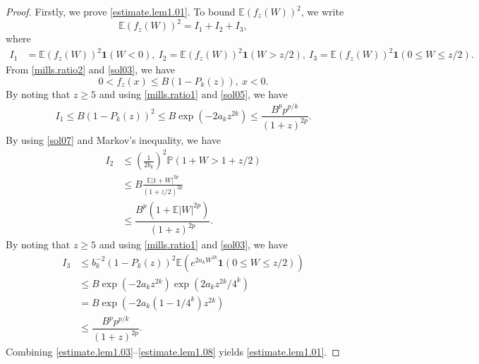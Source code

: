 \documentclass[10pt,a4paper]{amsart}
\def\E{\mathbb{E}}
\def\P{\mathbb{P}}
\begin{document}
	\begin{proof}
		Firstly, we prove \eqref{estimate.lem1.01}.
		To bound $\E(f_{z}(W))^2$, we write 
		\begin{equation}\label{estimate.lem1.03}
			\E (f_{z}(W))^2 =I_1+I_2+I_3,
		\end{equation}
		where
		\begin{equation*}
			\begin{split}
				I_1&=\E (f_{z}(W))^2\mathbf{1}(W< 0),\
				I_2=\E (f_{z}(W))^2\mathbf{1}(W>z/2),\
				I_3=\E (f_{z}(W))^2\mathbf{1}(0\le W\le z/2).
			\end{split}
		\end{equation*}
From  \eqref{mills.ratio2} and \eqref{sol03}, we have 
	\begin{equation}\label{sol05}
			0 < f_z(x) \le B(1-P_k(z)),\ x<0.
		\end{equation}
		By noting that $z\ge 5$ and using \eqref{mills.ratio1} and \eqref{sol05}, we have
		\begin{equation}\label{estimate.lem1.05}
			\begin{split}
				I_1\le B(1-P_k(z))^2 
				\le  B\exp \left(-2a_k z^{2 k}\right)
				\le \dfrac{B^pp^{p/k}}{(1+z)^{2p}}.
			\end{split} 
		\end{equation}
		By using \eqref{sol07} and Markov's inequality, we have
		\begin{equation}\label{estimate.lem1.07}
			\begin{split}
				I_2&\le \left(\frac{1}{2b_k}\right)^2 \P(1+W>1+z/2)\\
				&\le B \frac{\E|1+W|^{2p}}{(1+z/2)^{2p}}\\
				&\le \dfrac{B^p(1+\E|W|^{2p})}{(1+z)^{2p}}.
			\end{split} 
		\end{equation}
		By noting that $z\ge 5$ and using \eqref{mills.ratio1} and \eqref{sol03}, we have
		\begin{equation}\label{estimate.lem1.08}
			\begin{split}
				I_3		&\le b_k^{-2}(1-P_k(z))^2 \E \left(e^{2a_kW^{2k}} \mathbf{1}(0 \le W \le z/2)\right) \\
				&\le B\exp({-2a_kz^{2k}}) \exp({2a_kz^{2k}/4^k})\\
				&=B\exp({-2a_k(1-1/4^k)z^{2k}})\\
				&\le \dfrac{B^p p^{p/k}}{(1+z)^{2p}}.
			\end{split} 
		\end{equation}
		Combining \eqref{estimate.lem1.03}--\eqref{estimate.lem1.08} yields \eqref{estimate.lem1.01}.
		

\end{proof}
\end{document}
